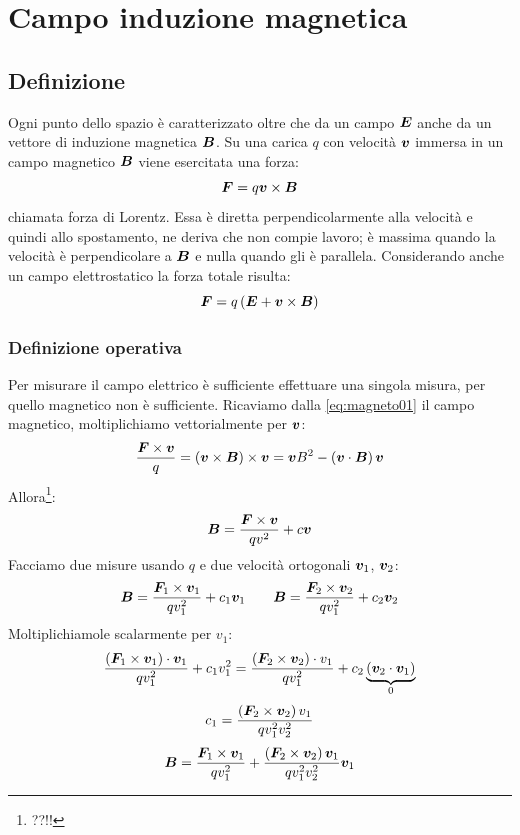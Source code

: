 \chapter{Campo induzione magnetica}
\minitoc
\section{Definizione}
Ogni punto dello spazio è caratterizzato oltre che da un campo $\boldsymbol{E}$ anche da un vettore di induzione magnetica $\boldsymbol{B}$. Su una carica $q$ con velocità $\boldsymbol{v}$ immersa in un campo magnetico $\boldsymbol{B}$ viene esercitata una forza:
\begin{equation}
  \boldsymbol{F}=q\boldsymbol{v}\times\boldsymbol{B}
  \label{eq:magneto01}
\end{equation}
chiamata forza di Lorentz. Essa è diretta perpendicolarmente alla velocità e quindi allo spostamento, ne deriva che non compie lavoro; è massima quando la velocità è perpendicolare a $\boldsymbol{B}$ e nulla quando gli è parallela. Considerando anche un campo elettrostatico la forza totale risulta:
\begin{equation}
  \boldsymbol{F}=q\left(\boldsymbol{E}+\boldsymbol{v}\times \boldsymbol{B}\right)
  \label{eq:forza_lorentz2}
\end{equation}
\subsection{Definizione operativa}
Per misurare il campo elettrico è sufficiente effettuare una singola misura, per quello magnetico non è sufficiente. Ricaviamo dalla \eqref{eq:magneto01} il campo magnetico, moltiplichiamo vettorialmente per $\boldsymbol{v}$:
\[\frac{\boldsymbol{F}\times\boldsymbol{v}}{q}=\left(\boldsymbol{v}\times\boldsymbol{B}\right)\times\boldsymbol{v}=\boldsymbol{v}B^2-\left(\boldsymbol{v}\cdot\boldsymbol{B}\right)\boldsymbol{v}\]
Allora\footnote{??!!}:
\[\boldsymbol{B}=\frac{\boldsymbol{F}\times\boldsymbol{v}}{qv^2}+c\boldsymbol{v}\]
Facciamo due misure usando $q$ e due velocità ortogonali $\boldsymbol{v}_1$, $\boldsymbol{v}_2$:
\[\boldsymbol{B}=\frac{\boldsymbol{F}_1\times \boldsymbol{v}_1}{qv_1^2}+c_1\boldsymbol{v}_1\qquad\boldsymbol{B}=\frac{\boldsymbol{F}_2\times\boldsymbol{v}_2}{qv_1^2}+c_2\boldsymbol{v}_2\]
Moltiplichiamole scalarmente per $v_1$:
\[\frac{\left(\boldsymbol{F}_1\times \boldsymbol{v}_1\right)\cdot\boldsymbol{v}_1}{qv_1^2}+c_1v_1^2=\frac{\left(\boldsymbol{F}_2\times\boldsymbol{v}_2\right)\cdot v_1}{qv_1^2}+c_2\underbrace{\left(\boldsymbol{v}_2\cdot \boldsymbol{v}_1\right)}_{0}\]
\[c_1=\frac{\left(\boldsymbol{F}_2\times\boldsymbol{v}_2\right)v_1}{qv_1^2v_2^2}\]
\[\boldsymbol{B}=\frac{\boldsymbol{F}_1\times\boldsymbol{v}_1}{qv_1^2}+\frac{\left(\boldsymbol{F}_2\times\boldsymbol{v}_2\right)\boldsymbol{v}_1}{qv_1^2v_2^2}\boldsymbol{v}_1\]
